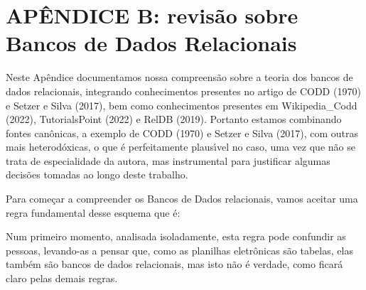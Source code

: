 \documentclass[
12pt,		%
openright,	%
twoside,  %
a4paper,			%
chapter=TITLE,		%
english,			%
french,				%
spanish,			%
brazil				%
]{USPSC-classe/USPSC}
\begin{document}
\chapter[AP\^ENDICE B: revis\~ao sobre Bancos de Dados Relacionais]{AP\^ENDICE B: revis\~ao sobre Bancos de Dados Relacionais}\label{AP\^ENDICE B: revis\~ao sobre Bancos de Dados Relacionais}
Neste Ap\^endice documentamos nossa compreens\~ao sobre a teoria dos bancos de dados relacionais, integrando conhecimentos presentes no artigo de  CODD (1970) e  Setzer e Silva (2017), bem como conhecimentos presentes em Wikipedia\_Codd (2022),  TutorialsPoint (2022) e  RelDB (2019). Portanto estamos combinando fontes can\^onicas, a exemplo de  CODD (1970) e Setzer e Silva (2017), com outras mais heterod\'oxicas, o que \'e perfeitamente plaus\'{\i}vel no caso, uma vez que n\~ao se trata de especialidade da autora, mas instrumental para justificar algumas decis\~oes tomadas ao longo deste trabalho.

















Para come\c{c}ar a compreender os Bancos de Dados relacionais, vamos aceitar uma regra fundamental desse esquema que \'e:


















\noindent\begin{center}\mbox{\centering{}}\end{center}


Num primeiro momento, analisada isoladamente, esta regra pode confundir as pessoas, levando-as a pensar que, como as planilhas eletr\^onicas s\~ao tabelas, elas tamb\'em s\~ao bancos de dados relacionais, mas isto n\~ao \'e verdade, como ficar\'a claro pelas demais regras.
\end{document}
